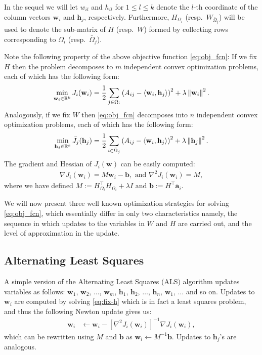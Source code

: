 \documentclass{vldb}
\newcommand{\ab}{\mathbf{a}}
\newcommand{\bb}{\mathbf{b}}
\newcommand{\hb}{\mathbf{h}}
\newcommand{\wb}{\mathbf{w}}
\newcommand{\Jbar}{\bar{J}}
\newcommand{\rbr}[1]{\left(#1\right)}
\newcommand{\sbr}[1]{\left[#1\right]}
\newcommand{\nbr}[1]{\left\|#1\right\|}
\newcommand{\inner}[2]{\left\langle #1,#2 \right\rangle}
\newcommand{\Omegabar}{\bar{\Omega}}
\begin{document}
In the sequel we will let $w_{il}$ and $h_{il}$ for $1 \leq l \leq k$
denote the $l$-th coordinate of the column vectors $\wb_i$ and $\hb_j$,
respectively.  Furthermore, $H_{\Omega_i}$ (resp.\ $W_{\Omegabar_{j}}$)
will be used to denote the sub-matrix of $H$ (resp.\ $W$) formed by
collecting rows corresponding to $\Omega_i$ (resp.\ $\Omegabar_{j}$).

Note the following property of the above objective function
\eqref{eq:obj_fcn}: If we fix $H$ then the problem decomposes to $m$
independent convex optimization problems, each of which has the
following form:
\begin{align}
  \label{eq:fix-h}
  \min_{\wb_i \in \RR^{k}} J_{i}(\wb_i) = \frac 1 2 \sum_{j \in
    \Omega_{i}} \rbr{A_{ij} - \inner{\wb_{i}}{\hb_{j}}}^{2} +
  \lambda \nbr{\wb_i}^{2}.
\end{align}
Analogously, if we fix $W$ then \eqref{eq:obj_fcn} decomposes into
$n$ independent convex optimization problems, each of which has the
following form:
\begin{align*}
  \min_{\hb_j \in \RR^{k}} \Jbar_{j}(\hb_j) = 
  \frac 1 2 \sum_{i \in \bar{\Omega}_{j}}
  \rbr{A_{ij} - \inner{\wb_{i}}{\hb_{j}}}^{2} + \lambda
  \nbr{\hb_j}^{2}.
\end{align*}
The gradient and Hessian of $J_{i}(\wb)$ can be easily computed:
\begin{align*}
  \nabla J_{i}(\wb_i) = M \wb_i - \bb, \text{ and } \nabla^{2}
  J_{i}(\wb_i) = M,
\end{align*}
where we have defined
$ M := H_{\Omega_{i}}^{\top} H_{\Omega_{i}} + \lambda I \text{ and } \bb
:= H^{\top} \ab_{i}$.

We will now present three well known optimization strategies for solving
\eqref{eq:obj_fcn}, which essentially differ in only two characteristics
namely, the sequence in which updates to the variables in $W$ and $H$
are carried out, and the level of approximation in the update.

\subsection{Alternating Least Squares}
\label{sec:AlternLeastSquar}


A simple version of the Alternating Least Squares (ALS) algorithm
updates variables as follows: $\wb_{1}$, $\wb_{2}$, $\ldots$, $\wb_{m}$,
$\hb_{1}$, $\hb_{2}$, $\ldots$, $\hb_{n}$, $\wb_{1}$, $\ldots$ and so
on. Updates to $\wb_{i}$ are computed by solving \eqref{eq:fix-h} which
is in fact a least squares problem, and thus the following Newton update
gives us: \begin{align}
  \label{eq:newton-fix-h}
  \wb_{i} & \leftarrow \wb_{i} - \sbr{\nabla^{2}
    J_{i}(\wb_{i})}^{-1} \nabla J_{i}(\wb_{i}),
\end{align}
which can be rewritten using $M$ and $\bb$ as $ \wb_{i} \leftarrow
M^{-1} \bb$.  Updates to $\hb_j$'s are analogous.
\end{document}
